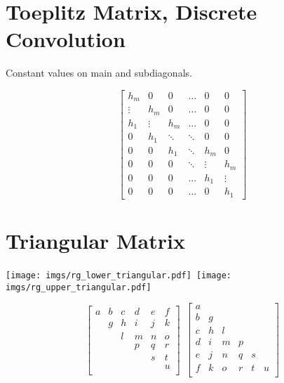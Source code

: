 \documentclass{book}
\begin{document}
\section{Toeplitz Matrix, Discrete Convolution}

Constant values on main and subdiagonals.

\begin{equation}
\begin{bmatrix}
  h_m &   0 &   0 &      \hdots &   0 &   0 \\
  \vdots & h_m &   0 &   \hdots &   0 &   0 \\
  h_1 & \vdots & h_m &   \hdots &   0 &   0 \\
    0 & h_1 & \ddots & \ddots &   0 &   0 \\
    0 &   0 & h_1 &    \ddots & h_m &   0 \\
    0 &   0 &   0 &    \ddots & \vdots & h_m \\
    0 &   0 &   0 &      \hdots & h_1 & \vdots \\
    0 &   0 &   0 &      \hdots &   0 & h_1 
\end{bmatrix}
\end{equation}


\section{Triangular Matrix}

\begin{center}
\texttt{[image: imgs/rg\_lower\_triangular.pdf]}~\texttt{[image: imgs/rg\_upper\_triangular.pdf]}
\end{center}

\begin{equation}
\begin{bmatrix}
a & b & c & d & e & f \\
  & g & h & i & j & k \\
  &   & l & m & n & o \\
  &   &   & p & q & r \\
  &   &   &   & s & t \\
  &   &   &   &   & u \\
\end{bmatrix}
~
~
\begin{bmatrix}
a &   &   &   &   &   \\
b & g &   &   &   &   \\
c & h & l &   &   &   \\
d & i & m & p &   &   \\
e & j & n & q & s &   \\
f & k & o & r & t & u \\
\end{bmatrix}
\end{equation}
\end{document}
